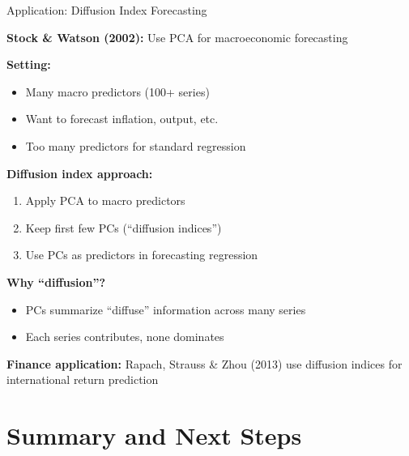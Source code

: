 \documentclass[10pt]{beamer}
\begin{document}
\begin{frame}{Application: Diffusion Index Forecasting}

  \textbf{Stock \& Watson (2002):} Use PCA for macroeconomic forecasting

  \vspace{0.5em}
  \textbf{Setting:}
  \begin{itemize}
    \item Many macro predictors (100+ series)
    \item Want to forecast inflation, output, etc.
    \item Too many predictors for standard regression
  \end{itemize}

  \vspace{0.5em}
  \textbf{Diffusion index approach:}
  \begin{enumerate}
    \item Apply PCA to macro predictors
    \item Keep first few PCs (``diffusion indices'')
    \item Use PCs as predictors in forecasting regression
  \end{enumerate}

  \vspace{0.5em}
  \textbf{Why ``diffusion''?}
  \begin{itemize}
    \item PCs summarize ``diffuse'' information across many series
    \item Each series contributes, none dominates
  \end{itemize}

  \vspace{0.3em}
  \textbf{Finance application:} Rapach, Strauss \& Zhou (2013) use diffusion indices for international return prediction
\end{frame}

\section{Summary and Next Steps}
\end{document}
